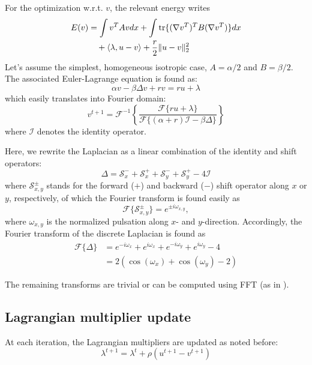For the optimization w.r.t. $v$, the relevant energy writes
\begin{align}
E(v) &= \int v^T A v dx + \int \operatorname{tr}\{(\nabla v^T)^T B (\nabla v^T)\} dx\\
&\quad + \langle \lambda, u-v \rangle + \frac{r}{2} \| u - v \|_2^2\nonumber
\end{align}
Let's assume the simplest, homogeneous isotropic case, $A = \alpha/2$ and $B = \beta/2$. The associated Euler-Lagrange equation is found as:
\begin{equation}
\alpha v - \beta\Delta v + rv = ru + \lambda
\end{equation}
which easily translates into Fourier domain:
\begin{equation}
v^{t+1} = \mathcal{F}^{-1}\left\{ \frac{\mathcal{F}\{ru + \lambda\}}{\mathcal{F}\{(\alpha+r)\mathcal{I}-\beta\Delta\}} \right\}
\end{equation}
where $\mathcal{I}$ denotes the identity operator.

Here, we rewrite the Laplacian as a linear combination of the identity and shift operators:
\begin{equation}
\Delta = \mathcal{S}_x^- + \mathcal{S}_x^+ + \mathcal{S}_y^- + \mathcal{S}_y^+ - 4 \mathcal{I}
\end{equation}
where $\mathcal{S}_{x,y}^{\pm}$ stands for the forward ($+$) and backward ($-$) shift operator along $x$ or $y$, respectively, of which the Fourier transform is found easily as
\begin{equation}
\mathcal{F}\{\mathcal{S}_{x,y}^{\pm}\} = e^{\pm i\omega_{x,y}},
\end{equation}
where $\omega_{x,y}$ is the normalized pulsation along $x$- and $y$-direction. Accordingly, the Fourier transform of the discrete Laplacian is found as
\begin{align}
\mathcal{F}\{\Delta\} &= e^{-i\omega_x } + e^{i\omega_x } + e^{-i\omega_y } + e^{i\omega_y } - 4\nonumber\\
&= 2\left( \cos(\omega_x) + \cos(\omega_y) - 2 \right)
\end{align}

The remaining transforms are trivial or can be computed using FFT (as in \citep{estellers_efficient_2011}).


\subsection{Lagrangian multiplier update}
At each iteration, the Lagrangian multipliers are updated as noted before:
\begin{equation}
\lambda^{t+1} = \lambda^t + \rho(u^{t+1}-v^{t+1})
\end{equation}

